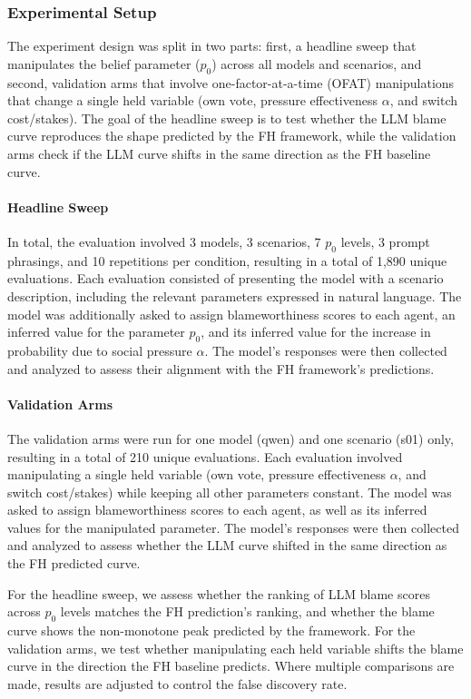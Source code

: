 \documentclass{article}
\begin{document}
\subsubsection{Experimental Setup}

The experiment design was split in two parts: first, a headline sweep that manipulates the belief parameter ($p_0$) across all models and scenarios, and second, validation arms that involve one-factor-at-a-time (OFAT) manipulations that change a single held variable (own vote, pressure effectiveness $\alpha$, and switch cost/stakes). The goal of the headline sweep is to test whether the LLM blame curve reproduces the shape predicted by the FH framework, while the validation arms check if the LLM curve shifts in the same direction as the FH baseline curve.

\paragraph{Headline Sweep} In total, the evaluation involved 3 models, 3 scenarios, 7 $p_0$ levels, 3 prompt phrasings, and 10 repetitions per condition, resulting in a total of 1,890 unique evaluations. Each evaluation consisted of presenting the model with a scenario description, including the relevant parameters expressed in natural language. The model was additionally asked to assign blameworthiness scores to each agent, an inferred value for the parameter $p_0$, and its inferred value for the increase in probability due to social pressure $\alpha$. The model's responses were then collected and analyzed to assess their alignment with the FH framework's predictions.

\paragraph{Validation Arms} The validation arms were run for one model (qwen) and one scenario (s01) only, resulting in a total of 210 unique evaluations. Each evaluation involved manipulating a single held variable (own vote, pressure effectiveness $\alpha$, and switch cost/stakes) while keeping all other parameters constant. The model was asked to assign blameworthiness scores to each agent, as well as its inferred values for the manipulated parameter. The model's responses were then collected and analyzed to assess whether the LLM curve shifted in the same direction as the FH predicted curve.

For the headline sweep, we assess whether the ranking of LLM blame scores across $p_0$ levels matches the FH prediction's ranking, and whether the blame curve shows the non-monotone peak predicted by the framework. For the validation arms, we test whether manipulating each held variable shifts the blame curve in the direction the FH baseline predicts. Where multiple comparisons are made, results are adjusted to control the false discovery rate.
\end{document}
